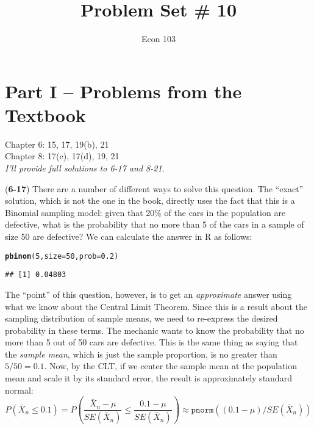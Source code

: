 \documentclass[addpoints,12pt]{exam}\usepackage[]{graphicx}\usepackage[]{color}
\title{Problem Set \# 10}
\author{Econ 103}
\date{}
\makeatletter
\newcommand{\hlnum}[1]{\textcolor[rgb]{0.686,0.059,0.569}{#1}}%
\newcommand{\hlstd}[1]{\textcolor[rgb]{0.345,0.345,0.345}{#1}}%
\newcommand{\hlkwc}[1]{\textcolor[rgb]{0.333,0.667,0.333}{#1}}%
\newcommand{\hlkwd}[1]{\textcolor[rgb]{0.737,0.353,0.396}{\textbf{#1}}}%
\newenvironment{kframe}{%
 \def\at@end@of@kframe{}%
 \ifinner\ifhmode%
  \def\at@end@of@kframe{\end{minipage}}%
  \begin{minipage}{\columnwidth}%
 \fi\fi%
 \def\FrameCommand##1{\hskip\@totalleftmargin \hskip-\fboxsep
 \colorbox{shadecolor}{##1}\hskip-\fboxsep
     \hskip-\linewidth \hskip-\@totalleftmargin \hskip\columnwidth}%
 \MakeFramed {\advance\hsize-\width
   \@totalleftmargin\z@ \linewidth\hsize
   \@setminipage}}%
 {\par\unskip\endMakeFramed%
 \at@end@of@kframe}
\newenvironment{knitrout}{}{} %
\makeatother
\begin{document}
\maketitle


\section*{Part I -- Problems from the Textbook}
 Chapter 6: 15, 17, 19(b), 21\\
 Chapter 8: 17(c), 17(d), 19, 21\\

\noindent \emph{I'll provide full  solutions to 6-17 and 8-21.}

\begin{questions}
  \item[]
  \begin{solution} (\textbf{6-17})
  There are a number of different ways to solve this question. The ``exact'' solution, which is not the one in the book, directly uses the fact that this is a Binomial sampling model: given that 20\% of the cars in the population are defective, what is the probability that no more than 5 of the cars in a sample of size 50 are defective? We can calculate the answer in R as follows:
\begin{knitrout}
\color{fgcolor}\begin{kframe}
\begin{alltt}
\hlkwd{pbinom}\hlstd{(}\hlnum{5}\hlstd{,} \hlkwc{size} \hlstd{=} \hlnum{50}\hlstd{,} \hlkwc{prob} \hlstd{=} \hlnum{0.2}\hlstd{)}
\end{alltt}
\begin{verbatim}
## [1] 0.04803
\end{verbatim}
\end{kframe}
\end{knitrout}
The ``point'' of this question, however, is to get an \emph{approximate} answer using what we know about the Central Limit Theorem. Since this is a result about the sampling distribution of sample means, we need to re-express the desired probability in these terms. The mechanic wants to know the probability that no more than 5 out of 50 cars are defective. This is the same thing as saying that the \emph{sample mean}, which is just the sample proportion, is no greater than $5/50 = 0.1$. Now, by the CLT, if we center the sample mean at the population mean and scale it by its standard error, the result is approximately standard normal:
$$P(\bar{X}_n \leq 0.1) = P\left(\frac{\bar{X}_n - \mu}{SE(\bar{X}_n)} \leq \frac{0.1 - \mu}{SE(\bar{X}_n)} \right) \approx \texttt{pnorm}((0.1 - \mu)/SE(\bar{X}_n) )$$

\end{solution}
\end{questions}
\end{document}
